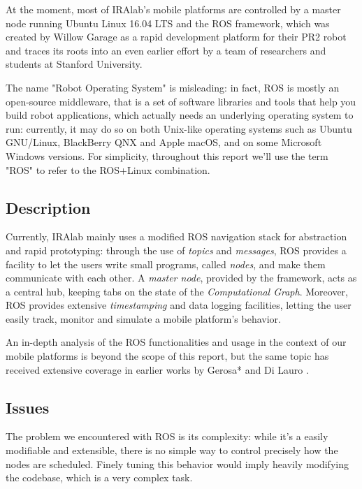 \documentclass[a4paper,12pt]{report}
\begin{document}
At the moment, most of IRAlab's mobile platforms are controlled by a master node running Ubuntu Linux 16.04 LTS and the ROS framework, which was created by Willow Garage as a rapid development platform for their PR2 robot and traces its roots into an even earlier effort by a team of researchers and students at Stanford University. 

The name "Robot Operating System" is misleading: in fact, ROS is mostly an open-source middleware, that is a set of software libraries and tools that help you build robot applications, which actually needs an underlying operating system to run: currently, it may do so on both Unix-like operating systems such as Ubuntu GNU/Linux, BlackBerry QNX \cite{qnx-ros} and Apple macOS, and on some Microsoft Windows versions. For simplicity, throughout this report we'll use the term "ROS" to refer to the ROS+Linux combination.

\subsection{Description}

Currently, IRAlab mainly uses a modified ROS navigation stack for abstraction and rapid prototyping: through the use of \textit{topics} and \textit{messages}, ROS provides a facility to let the users write small programs, called \textit{nodes}, and make them communicate with each other. A \textit{master node}, provided by the framework, acts as a central hub, keeping tabs on the state of the \textit{Computational Graph}. Moreover, ROS provides extensive \textit{timestamping} and data logging facilities, letting the user easily track, monitor and simulate a mobile platform's behavior.

An in-depth analysis of the ROS functionalities and usage in the context of our mobile platforms is beyond the scope of this report, but the same topic has received extensive coverage in earlier works by Gerosa* and Di Lauro \cite{fdila-bs-otto}.

\subsection{Issues}

The problem we encountered with ROS is its complexity: while it's a easily modifiable and extensible, there is no simple way to control precisely how the nodes are scheduled. Finely tuning this behavior would imply heavily modifying the codebase, which is a very complex task. 
\end{document}
